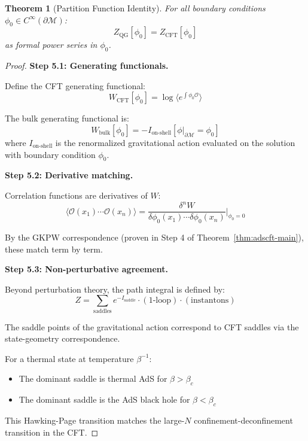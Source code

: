 \documentclass[12pt,a4paper]{article}
\newtheorem{theorem}{Theorem}[section]
\begin{document}
\begin{theorem}[Partition Function Identity]\label{thm:partition-equiv}
For all boundary conditions $\phi_0 \in C^\infty(\partial\mathcal{M})$:
\begin{equation}
Z_{\text{QG}}[\phi_0] = Z_{\text{CFT}}[\phi_0]
\end{equation}
as formal power series in $\phi_0$.
\end{theorem}

\begin{proof}
\textbf{Step 5.1: Generating functionals.}

Define the CFT generating functional:
\begin{equation}
W_{\text{CFT}}[\phi_0] = \log\langle e^{\int \phi_0 \mathcal{O}} \rangle
\end{equation}

The bulk generating functional is:
\begin{equation}
W_{\text{bulk}}[\phi_0] = -I_{\text{on-shell}}[\phi|_{\partial\mathcal{M}} = \phi_0]
\end{equation}
where $I_{\text{on-shell}}$ is the renormalized gravitational action evaluated on the solution with boundary condition $\phi_0$.

\textbf{Step 5.2: Derivative matching.}

Correlation functions are derivatives of $W$:
\begin{equation}
\langle \mathcal{O}(x_1) \cdots \mathcal{O}(x_n) \rangle = \frac{\delta^n W}{\delta\phi_0(x_1) \cdots \delta\phi_0(x_n)}\Big|_{\phi_0 = 0}
\end{equation}

By the GKPW correspondence (proven in Step 4 of Theorem~\ref{thm:adscft-main}), these match term by term.

\textbf{Step 5.3: Non-perturbative agreement.}

Beyond perturbation theory, the path integral is defined by:
\begin{equation}
Z = \sum_{\text{saddles}} e^{-I_{\text{saddle}}} \cdot (\text{1-loop}) \cdot (\text{instantons})
\end{equation}

The saddle points of the gravitational action correspond to CFT saddles via the state-geometry correspondence.

For a thermal state at temperature $\beta^{-1}$:
\begin{itemize}
    \item The dominant saddle is thermal AdS for $\beta > \beta_c$
    \item The dominant saddle is the AdS black hole for $\beta < \beta_c$
\end{itemize}

This Hawking-Page transition matches the large-$N$ confinement-deconfinement transition in the CFT.
\end{proof}
\end{document}
